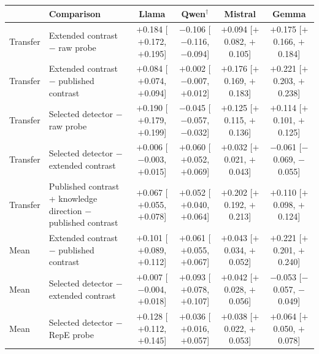 \begin{tabular}{@{}ll cccc@{}}
\toprule
& Comparison & Llama & Qwen$^\dagger$ & Mistral & Gemma \\
\midrule
Transfer & Extended contrast $-$ raw probe & $+$0.184 [$+$0.172, $+$0.195] & $-$0.106 [$-$0.116, $-$0.094] & $+$0.094 [$+$0.082, $+$0.105] & $+$0.175 [$+$0.166, $+$0.184] \\
Transfer & Extended contrast $-$ published contrast & $+$0.084 [$+$0.074, $+$0.094] & $+$0.002 [$-$0.007, $+$0.012] & $+$0.176 [$+$0.169, $+$0.183] & $+$0.221 [$+$0.203, $+$0.238] \\
Transfer & Selected detector $-$ raw probe & $+$0.190 [$+$0.179, $+$0.199] & $-$0.045 [$-$0.057, $-$0.032] & $+$0.125 [$+$0.115, $+$0.136] & $+$0.114 [$+$0.101, $+$0.125] \\
Transfer & Selected detector $-$ extended contrast & $+$0.006 [$-$0.003, $+$0.015] & $+$0.060 [$+$0.052, $+$0.069] & $+$0.032 [$+$0.021, $+$0.043] & $-$0.061 [$-$0.069, $-$0.055] \\
Transfer & Published contrast + knowledge direction $-$ published contrast & $+$0.067 [$+$0.055, $+$0.078] & $+$0.052 [$+$0.040, $+$0.064] & $+$0.202 [$+$0.192, $+$0.213] & $+$0.110 [$+$0.098, $+$0.124] \\
Mean & Extended contrast $-$ published contrast & $+$0.101 [$+$0.089, $+$0.112] & $+$0.061 [$+$0.055, $+$0.067] & $+$0.043 [$+$0.034, $+$0.052] & $+$0.221 [$+$0.201, $+$0.240] \\
Mean & Selected detector $-$ extended contrast & $+$0.007 [$-$0.004, $+$0.018] & $+$0.093 [$+$0.078, $+$0.107] & $+$0.042 [$+$0.028, $+$0.056] & $-$0.053 [$-$0.057, $-$0.049] \\
Mean & Selected detector $-$ RepE probe & $+$0.128 [$+$0.112, $+$0.145] & $+$0.036 [$+$0.016, $+$0.057] & $+$0.038 [$+$0.022, $+$0.053] & $+$0.064 [$+$0.050, $+$0.078] \\
\bottomrule
\end{tabular}
